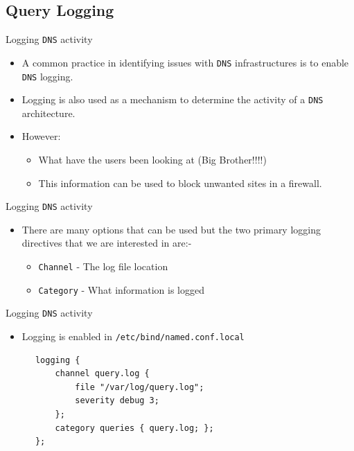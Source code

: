 \documentclass[xcolor=table]{beamer}
\begin{document}
\subsection{Query Logging}
\begin{frame}{Logging \texttt{DNS} activity}
  \begin{itemize}
    \item A common practice in identifying issues with \texttt{DNS} infrastructures is to enable \texttt{DNS} logging.
    \item Logging is also used as a mechanism to determine the activity of a \texttt{DNS} architecture.
    \item However:
      \begin{itemize}
        \item What have the users been looking at (Big Brother!!!!)
        \item This information can be used to block unwanted sites in a firewall.
      \end{itemize}
  \end{itemize}
\end{frame}

\begin{frame}{Logging \texttt{DNS} activity}
  \begin{itemize}
    \item There are many options that can be used but the two primary logging directives that we are interested in are:-
      \begin{itemize}
        \item \texttt{Channel} - The log file location
        \item \texttt{Category} - What information is logged
      \end{itemize}
  \end{itemize}
\end{frame}

\begin{frame}[fragile]{Logging \texttt{DNS} activity}
  \begin{itemize}
    \item Logging is enabled in \texttt{/etc/bind/named.conf.local}
  \end{itemize}
  \begin{tcolorbox}
    \lstset{
      basicstyle=\tiny\ttfamily,
    }
    \begin{lstlisting}
      logging {
	      channel query.log {
	          file "/var/log/query.log";
	          severity debug 3;
	      };
	      category queries { query.log; };
      };
    \end{lstlisting}
  \end{tcolorbox}
\end{frame}
\end{document}
